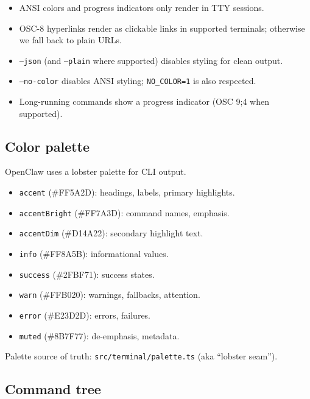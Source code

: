 \begin{itemize}
  \item ANSI colors and progress indicators only render in TTY sessions.
  \item OSC-8 hyperlinks render as clickable links in supported terminals; otherwise we fall back to plain URLs.
  \item \texttt{--json} (and \texttt{--plain} where supported) disables styling for clean output.
  \item \texttt{--no-color} disables ANSI styling; \texttt{NO\_COLOR=1} is also respected.
  \item Long-running commands show a progress indicator (OSC 9;4 when supported).
\end{itemize}


\subsection{Color palette}


OpenClaw uses a lobster palette for CLI output.

\begin{itemize}
  \item \texttt{accent} (\#FF5A2D): headings, labels, primary highlights.
  \item \texttt{accentBright} (\#FF7A3D): command names, emphasis.
  \item \texttt{accentDim} (\#D14A22): secondary highlight text.
  \item \texttt{info} (\#FF8A5B): informational values.
  \item \texttt{success} (\#2FBF71): success states.
  \item \texttt{warn} (\#FFB020): warnings, fallbacks, attention.
  \item \texttt{error} (\#E23D2D): errors, failures.
  \item \texttt{muted} (\#8B7F77): de-emphasis, metadata.
\end{itemize}


Palette source of truth: \texttt{src/terminal/palette.ts} (aka “lobster seam”).

\subsection{Command tree}



